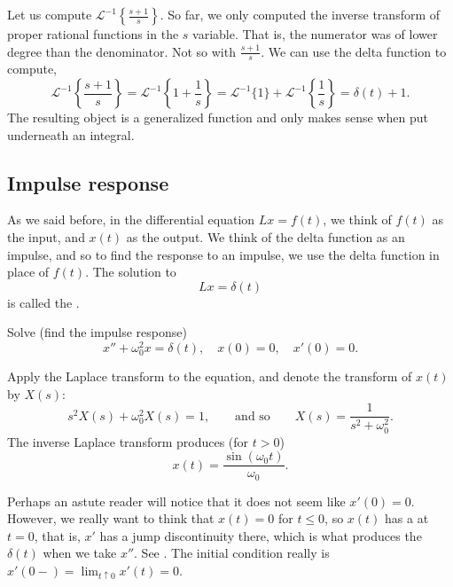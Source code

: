 \begin{example}
Let us compute ${\mathcal{L}}^{-1} \left\{ \frac{s+1}{s} \right\}$.
So far, we only computed the inverse transform of
proper rational functions in the $s$ variable.
That is, the numerator was of lower degree than the denominator.
Not so with $\frac{s+1}{s}$.
We can use the delta function to compute,
\begin{equation*}
{\mathcal{L}}^{-1} \left\{ \frac{s+1}{s} \right\}
=
{\mathcal{L}}^{-1} \left\{ 1 + \frac{1}{s} \right\}
=
{\mathcal{L}}^{-1} \{ 1 \}
+
{\mathcal{L}}^{-1} \left\{ \frac{1}{s} \right\}
=
\delta(t) + 1 .
\end{equation*}
The resulting object is a generalized
function and only makes sense when put underneath an integral.
\end{example}

\subsection{Impulse response}

As we said before, in the differential equation
$L x = f(t)$,
we think of $f(t)$ as the input, and $x(t)$ as the output.
We think of the delta function as an impulse, and so
to find the response to an impulse, we use
the delta function in place of $f(t)$.
The solution to
\begin{equation*}
L x = \delta(t)
\end{equation*}
is called the
\emph{}.

\begin{example}
Solve (find the impulse response)
\begin{equation} \label{eq:lteximpulseresp}
x'' + \omega_0^2 x = \delta(t) , \quad x(0) = 0, \quad x'(0) = 0 .
\end{equation}

Apply the Laplace transform to the equation, and denote
the transform of $x(t)$ by $X(s)$:
\begin{equation*}
s^2 X(s) + \omega_0^2 X(s) = 1 ,
\qquad \text{and so} \qquad
X(s) = \frac{1}{s^2+ \omega_0^2} .
\end{equation*}
The inverse Laplace transform produces (for $t > 0$)
\begin{equation*}
x(t) = 
\frac{\sin (\omega_0 t)}{\omega_0} .
\end{equation*}
\end{example}

\begin{remark}
Perhaps an astute reader will notice that it does not seem like $x'(0)=0$.
However, we really want to think that $x(t)=0$ for $t \leq 0$, so $x(t)$
has a  at $t=0$, that is,
$x'$ has a jump discontinuity there,
which is what produces the $\delta(t)$ when we take $x''$.
See .
The initial condition really is $x'(0-) = \lim_{t \uparrow 0} x'(t) = 0$.
\end{remark}

